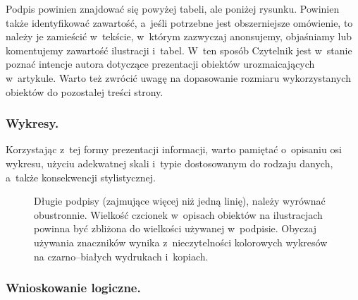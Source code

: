 \noindent Podpis powinien znajdować się powyżej tabeli, ale poniżej rysunku. Powinien także identyfikować zawartość, a~jeśli potrzebne jest obszerniejsze omówienie, to należy je zamieścić w~tekście, w~którym zazwyczaj anonsujemy, objaśniamy lub komentujemy zawartość ilustracji i~tabel. W~ten sposób Czytelnik jest w~stanie poznać intencje autora dotyczące prezentacji obiektów urozmaicających w~artykule. Warto też zwrócić uwagę na dopasowanie rozmiaru wykorzystanych obiektów do pozostałej treści strony.

\subsubsection{Wykresy.}
\label{subsubsec:charts}

Korzystając z~tej formy prezentacji informacji, warto pamiętać o~opisaniu osi wykresu, użyciu adekwatnej skali i~typie dostosowanym do rodzaju danych, a~także konsekwencji stylistycznej.

\begin{figure}[!h]
	\centering
	\caption{Długie podpisy (zajmujące więcej niż jedną linię), należy wyrównać obustronnie. Wielkość czcionek w~opisach obiektów na ilustracjach powinna być zbliżona do wielkości używanej w~podpisie. Obyczaj używania znaczników wynika z~nieczytelności kolorowych wykresów na czarno--białych wydrukach i~kopiach.}
	\label{fig:stats}
	\vspace{-20pt}
\end{figure}

\subsubsection{Wnioskowanie logiczne.}
\label{subsubsec:logic}

